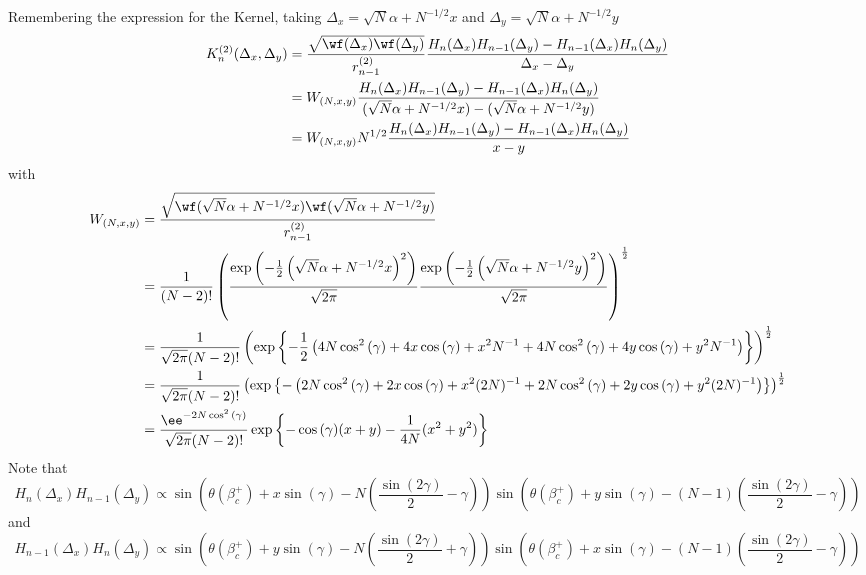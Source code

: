 {Remembering the expression for the Kernel, taking $\Delta_x = \sqrt{N}\alpha + N^{-1/2} x$ and $\Delta_y = \sqrt{N}\alpha + N^{-1/2} y$
\begin{align}
	K_n^{(2)}(\Delta_x,\Delta_y) & = \frac{\sqrt{\wf(\Delta_x) \wf(\Delta_y)}}{r_{n-1}^{(2)}} \frac{H_n(\Delta_x)H_{n-1}(\Delta_y) - H_{n-1}(\Delta_x)H_n(\Delta_y)}{\Delta_x-\Delta_y} \\
	& = W_{(N,x,y)} \frac{H_n(\Delta_x)H_{n-1}(\Delta_y) - H_{n-1}(\Delta_x)H_n(\Delta_y)}{(\sqrt{N}\alpha + N^{-1/2} x)-(\sqrt{N}\alpha + N^{-1/2} y)} \\
	& = W_{(N,x,y)} N^{1/2} \frac{H_n(\Delta_x)H_{n-1}(\Delta_y) - H_{n-1}(\Delta_x)H_n(\Delta_y)}{x-y}
\end{align}
with 
\begin{align}
	W_{(N,x,y)} & = \frac{\sqrt{\wf(\sqrt{N}\alpha + N^{-1/2} x) \wf(\sqrt{N}\alpha + N^{-1/2} y)}}{r_{n-1}^{(2)}} \\
	& = \frac{1}{(N-2)!} \left(\frac{\exp{\left( -\frac{1}{2} \left(\sqrt{N}\alpha + N^{-1/2} x \right)^2 \right)}}{\sqrt{2\pi}}  \frac{\exp{\left( -\frac{1}{2} \left(\sqrt{N}\alpha + N^{-1/2} y \right)^2 \right)}}{\sqrt{2\pi}} \right)^{\frac{1}{2}} \\
	& = \frac{1}{\sqrt{2\pi} (N-2)!} \left( \exp{\left\{ -\frac{1}{2} \left( 4 N \cos^2{(\gamma)} + 4 x \cos{(\gamma)} + x^2 N^{-1} + 4 N \cos^2{(\gamma)} + 4 y \cos{(\gamma)} + y^2 N^{-1} \right) \right\}} \right)^{\frac{1}{2}} \\
	& = \frac{1}{\sqrt{2\pi} (N-2)!} \left( \exp{\left\{ - \left( 2N \cos^2{(\gamma)} + 2 x \cos{(\gamma)} + x^2 (2N)^{-1} + 2 N \cos^2{(\gamma)} + 2 y \cos{(\gamma)} + y^2 (2N)^{-1} \right) \right\}} \right)^{\frac{1}{2}} \\
	& = \frac{\ee^{-2N\cos^2{(\gamma)}}}{\sqrt{2\pi} (N-2)!}
	\exp{\left\{-\cos{(\gamma)} (x+y) - \frac{1}{4N} (x^2 + y^2) \right\}} 
\end{align}
Note that
\begin{equation}
	H_n(\Delta_x)H_{n-1}(\Delta_y) \propto \sin{\left(\theta(\beta_c^+) + x \sin{(\gamma)}-N\left(\frac{\sin{(2\gamma)}}{2}-\gamma\right)\right)} \sin{\left(\theta(\beta_c^+) + y \sin{(\gamma)} - (N-1) \left(\frac{\sin{(2\gamma)}}{2}-\gamma\right)\right)} 
\end{equation}
and
\begin{equation}
	H_{n-1}(\Delta_x)H_n(\Delta_y) \propto \sin{\left(\theta(\beta_c^+) + y \sin{(\gamma)}- N\left(\frac{\sin{(2\gamma)}}{2}+ \gamma\right)\right)} \sin{\left(\theta(\beta_c^+) + x \sin{(\gamma)} - (N-1) \left(\frac{\sin{(2\gamma)}}{2}-\gamma\right)\right)} 

\end{equation}}

